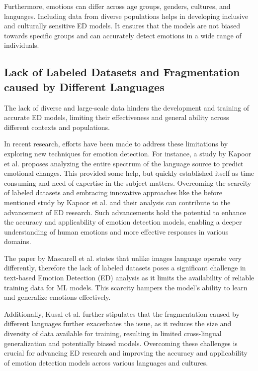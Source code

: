 \documentclass[11pt]{article}
\begin{document}
Furthermore, emotions can differ across age groups, genders, cultures, and languages. Including data from diverse populations helps in developing inclusive and culturally sensitive ED models. It ensures that the models are not biased towards specific groups and can accurately detect emotions in a wide range of individuals.

\subsection{Lack of Labeled Datasets and Fragmentation caused by Different Languages}

The lack of diverse and large-scale data hinders the development and training of accurate ED models, limiting their effectiveness and general ability across different contexts and populations.

In recent research, efforts have been made to address these limitations by exploring new techniques for emotion detection. For instance, a study by Kapoor\cite{KAPOOR2023120882} et al. proposes analyzing the entire spectrum of the language source to predict emotional changes. This provided some help, but quickly established itself as time consuming and need of expertise in the subject matters. Overcoming the scarcity of labeled datasets and embracing innovative approaches like the before mentioned study by Kapoor\cite{KAPOOR2023120882} et al. and their analysis can contribute to the advancement of ED research. Such advancements hold the potential to enhance the accuracy and applicability of emotion detection models, enabling a deeper understanding of human emotions and more effective responses in various domains.

The paper by Mascarell\cite{mascarell-etal-2021-stance} et al. states that unlike images language operate very differently, therefore the lack of labeled datasets poses a significant challenge in text-based Emotion Detection (ED) analysis as it limits the availability of reliable training data for ML models. This scarcity hampers the model's ability to learn and generalize emotions effectively.

Additionally, Kusal et al. further stipulates \cite{kusal} that the fragmentation caused by different languages further exacerbates the issue, as it reduces the size and diversity of data available for training, resulting in limited cross-lingual generalization and potentially biased models. Overcoming these challenges is crucial for advancing ED research and improving the accuracy and applicability of emotion detection models across various languages and cultures.
\end{document}
